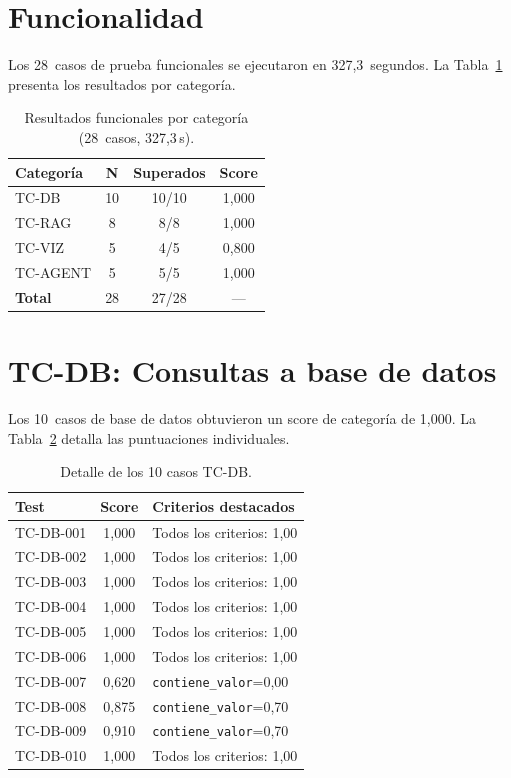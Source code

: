 \section{Funcionalidad}
\label{sec:res_funcional}

Los 28~casos de prueba funcionales se ejecutaron en 327,3~segundos. La Tabla~\ref{tab:res_funcional} presenta los resultados por categoría.

\begin{table}[H]
\centering
\caption{Resultados funcionales por categoría (28~casos, 327,3\,s).}
\label{tab:res_funcional}
\footnotesize
\begin{tabularx}{\columnwidth}{lccc}
\toprule
\textbf{Categoría} & \textbf{N} & \textbf{Superados} & \textbf{Score} \\
\midrule
TC-DB    & 10 & 10/10 & 1,000 \\
TC-RAG   & 8  & 8/8   & 1,000 \\
TC-VIZ   & 5  & 4/5   & 0,800 \\
TC-AGENT & 5  & 5/5   & 1,000 \\
\midrule
\textbf{Total} & 28 & 27/28 & --- \\
\bottomrule
\end{tabularx}
\end{table}

\section{TC-DB: Consultas a base de datos}

Los 10~casos de base de datos obtuvieron un score de categoría de 1,000. La Tabla~\ref{tab:res_tc_db} detalla las puntuaciones individuales.

\begin{table}[H]
\centering
\caption{Detalle de los 10 casos TC-DB.}
\label{tab:res_tc_db}
\footnotesize
\begin{tabularx}{\columnwidth}{lcX}
\toprule
\textbf{Test} & \textbf{Score} & \textbf{Criterios destacados} \\
\midrule
TC-DB-001 & 1,000 & Todos los criterios: 1,00 \\
TC-DB-002 & 1,000 & Todos los criterios: 1,00 \\
TC-DB-003 & 1,000 & Todos los criterios: 1,00 \\
TC-DB-004 & 1,000 & Todos los criterios: 1,00 \\
TC-DB-005 & 1,000 & Todos los criterios: 1,00 \\
TC-DB-006 & 1,000 & Todos los criterios: 1,00 \\
TC-DB-007 & 0,620 & \texttt{contiene\_valor}=0,00 \\
TC-DB-008 & 0,875 & \texttt{contiene\_valor}=0,70 \\
TC-DB-009 & 0,910 & \texttt{contiene\_valor}=0,70 \\
TC-DB-010 & 1,000 & Todos los criterios: 1,00 \\
\bottomrule
\end{tabularx}
\end{table}

